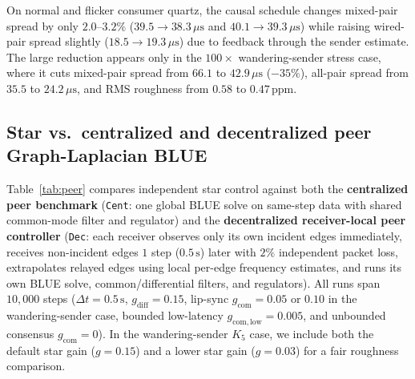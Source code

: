 \documentclass[11pt,a4paper]{article}
\theoremstyle{definition}
\begin{document}
On normal and flicker consumer quartz, the causal schedule changes mixed-pair
spread by only $2.0$--$3.2\%$ ($39.5 \to 38.3\,\mu\text{s}$ and
$40.1 \to 39.3\,\mu\text{s}$) while raising wired-pair spread slightly
($18.5 \to 19.3\,\mu\text{s}$) due to feedback through the sender estimate. The
large reduction appears only in the $100\times$ wandering-sender stress case,
where it cuts mixed-pair spread from $66.1$ to $42.9\,\mu\text{s}$ ($-35\%$),
all-pair spread from $35.5$ to $24.2\,\mu\text{s}$, and RMS roughness from
$0.58$ to $0.47\,\text{ppm}$.

\subsection{Star vs.\ centralized and decentralized peer Graph-Laplacian BLUE}
\label{sec:sim-peer}

Table~\ref{tab:peer} compares independent star control against both the
\textbf{centralized peer benchmark} (\texttt{Cent}: one global BLUE solve on
same-step data with shared common-mode filter and regulator) and the
\textbf{decentralized receiver-local peer controller} (\texttt{Dec}: each
receiver observes only its own incident edges immediately, receives
non-incident edges $1$ step ($0.5\,\text{s}$) later with $2\%$ independent
packet loss, extrapolates relayed edges using local per-edge frequency
estimates, and runs its own BLUE solve, common/differential filters, and
regulators). All runs span $10{,}000$ steps ($\Delta t = 0.5\,\text{s}$,
$g_{\mathrm{diff}} = 0.15$, lip-sync $g_{\mathrm{com}} = 0.05$ or $0.10$ in the
wandering-sender case, bounded low-latency $g_{\mathrm{com,low}} = 0.005$, and
unbounded consensus $g_{\mathrm{com}} = 0$). In the wandering-sender $K_5$
case, we include both the default star gain ($g = 0.15$) and a lower star gain
($g = 0.03$) for a fair roughness comparison.
\end{document}
